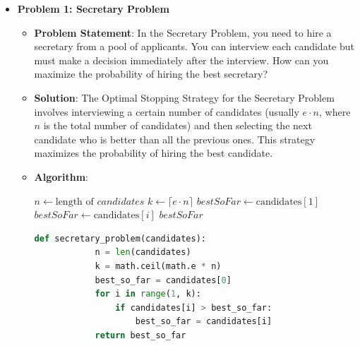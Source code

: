 \documentclass[12pt]{book} %
\begin{document}
\begin{itemize}
    \item \textbf{Problem 1: Secretary Problem}
    \begin{itemize}
        \item \textbf{Problem Statement}: In the Secretary Problem, you need to hire a secretary from a pool of applicants. You can interview each candidate but must make a decision immediately after the interview. How can you maximize the probability of hiring the best secretary?
        \item \textbf{Solution}: The Optimal Stopping Strategy for the Secretary Problem involves interviewing a certain number of candidates (usually $e \cdot n$, where $n$ is the total number of candidates) and then selecting the next candidate who is better than all the previous ones. This strategy maximizes the probability of hiring the best candidate.
        \item \textbf{Algorithm}:
        \begin{algorithm}[H]
        \caption{Optimal Stopping for Secretary Problem}
        \begin{algorithmic}[1]
            \State $n \gets \text{length of } candidates$
            \State $k \gets \lceil e \cdot n \rceil$ 
            \State $bestSoFar \gets \text{candidates}[1]$
                    \State $bestSoFar \gets \text{candidates}[i]$
                \EndIf
            \EndFor
            \State \Return $bestSoFar$
        \EndFunction
        \end{algorithmic}
        \end{algorithm}
        \FloatBarrier
        \begin{lstlisting}[language=Python]
        def secretary_problem(candidates):
            n = len(candidates)
            k = math.ceil(math.e * n)
            best_so_far = candidates[0]
            for i in range(1, k):
                if candidates[i] > best_so_far:
                    best_so_far = candidates[i]
            return best_so_far
        \end{lstlisting}
        \FloatBarrier
    \end{itemize}
    

\end{itemize}
\end{document}
